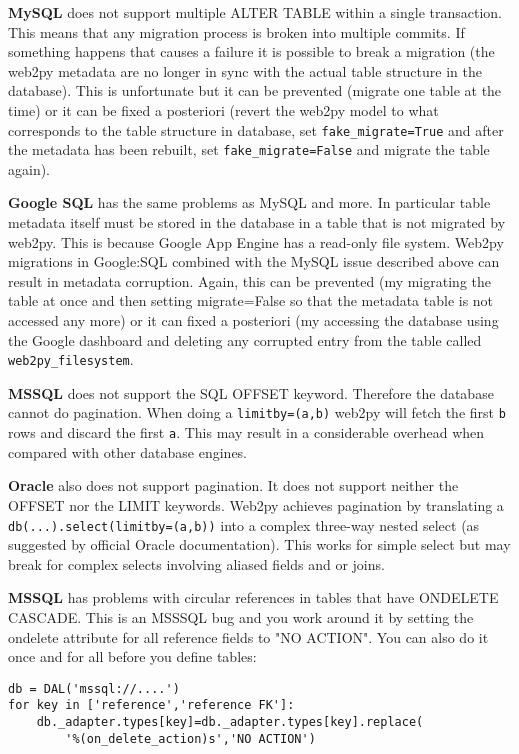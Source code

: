 \documentclass[justified,sixbynine,notoc]{tufte-book}
\def\ft{\small\tt}
\def\inxx#1{\index{#1}}
\begin{document}
\begin{fullwidth}
{\bf MySQL} does not support multiple ALTER TABLE within a single transaction. This means that any migration process is broken into multiple commits. If something happens that causes a failure it is possible to break a migration (the web2py metadata are no longer in sync with the actual table structure in the database). This is unfortunate but it can be prevented (migrate one table at the time) or it can be fixed a posteriori (revert the web2py model to what corresponds to the table structure in database, set {\ft fake\_migrate=True} and after the metadata has been rebuilt, set {\ft fake\_migrate=False} and migrate the table again).

{\bf Google SQL} has the same problems as MySQL and more. In particular table metadata itself must be stored in the database in a table that is not migrated by web2py. This is because Google App Engine has a read-only file system. Web2py migrations in Google:SQL combined with the MySQL issue described above can result in metadata corruption. Again, this can be prevented (my migrating the table at once and then setting migrate=False so that the metadata table is not accessed any more) or it can fixed a posteriori (my accessing the database using the Google dashboard and deleting any corrupted entry from the table called {\ft web2py\_filesystem}.

\inxx{limitby}
{\bf MSSQL} does not support the SQL OFFSET keyword. Therefore the database cannot do pagination. When doing a {\ft limitby=(a,b)} web2py will fetch the first {\ft b} rows and discard the first {\ft a}. This may result in a considerable overhead when compared with other database engines.

{\bf Oracle} also does not support pagination. It does not support neither the OFFSET nor the LIMIT keywords. Web2py achieves pagination by translating a {\ft db(...).select(limitby=(a,b))} into a complex three-way nested select (as suggested by official Oracle documentation). This works for simple select but may break for complex selects involving aliased fields and or joins.

{\bf MSSQL} has problems with circular references in tables that have ONDELETE CASCADE. This is an MSSSQL bug and you work around it by setting the ondelete attribute for all reference fields to "NO ACTION". You can also do it once and for all before you define tables:

\begin{lstlisting}
db = DAL('mssql://....')
for key in ['reference','reference FK']:
    db._adapter.types[key]=db._adapter.types[key].replace(
        '%(on_delete_action)s','NO ACTION')
\end{lstlisting}


\end{fullwidth}
\end{document}
